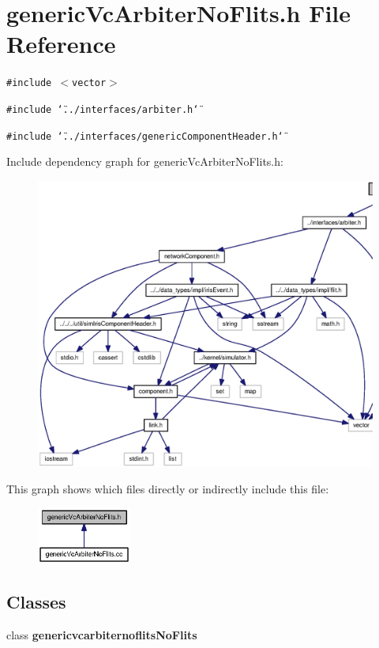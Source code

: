 \section{genericVcArbiterNoFlits.h File Reference}
\label{genericVcArbiterNoFlits_8h}
{\tt \#include $<$vector$>$}\par
{\tt \#include \char`\"{}../interfaces/arbiter.h\char`\"{}}\par
{\tt \#include \char`\"{}../interfaces/genericComponentHeader.h\char`\"{}}\par


Include dependency graph for genericVcArbiterNoFlits.h:\nopagebreak
\begin{figure}[H]
\begin{center}
\leavevmode
\includegraphics[width=420pt]{genericVcArbiterNoFlits_8h__incl}
\end{center}
\end{figure}


This graph shows which files directly or indirectly include this file:\nopagebreak
\begin{figure}[H]
\begin{center}
\leavevmode
\includegraphics[width=88pt]{genericVcArbiterNoFlits_8h__dep__incl}
\end{center}
\end{figure}
\subsection*{Classes}
\begin{CompactItemize}
\item 
class {\bf genericvcarbiternoflitsNoFlits}
\end{CompactItemize}
